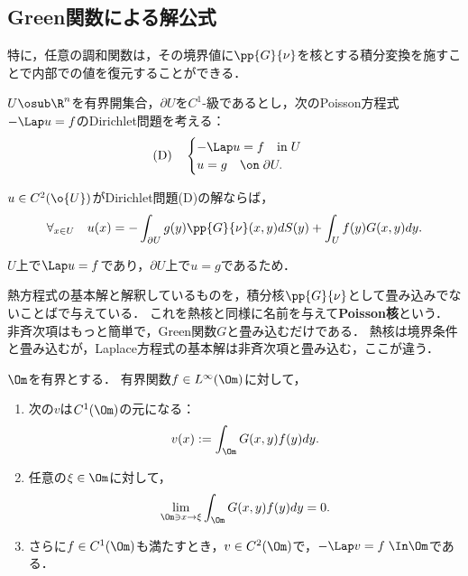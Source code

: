 \documentclass[uplatex,dvipdfmx]{jsreport}
\begin{document}
\subsection{Green関数による解公式}

\begin{tcolorbox}[colframe=ForestGreen, colback=ForestGreen!10!white,breakable,colbacktitle=ForestGreen!40!white,coltitle=black,fonttitle=\bfseries\sffamily,
title=]
    特に，任意の調和関数は，その境界値に$\pp{G}{\nu}$を核とする積分変換を施すことで内部での値を復元することができる．
\end{tcolorbox}

\begin{problem}[境界を持つ有界領域上のPoisson方程式のDirichlet問題の解法]
    $U\osub\R^n$を有界開集合，$\partial U$を$C^1$-級であるとし，次のPoisson方程式$-\Lap u=f$のDirichlet問題を考える：
    \[\text{(D)}\quad\begin{cases}
        -\Lap u=f\quad\mathrm{in}\;U\\
        u=g\quad\on\;\partial U.
    \end{cases}\]
\end{problem}

\begin{corollary}[Green関数によるDirichlet問題の解の積分表示]\label{cor-solution-via-Green-function}
    $u\in C^2(\o{U})$がDirichlet問題(D)の解ならば，
    \[\forall_{x\in U}\quad u(x)=-\int_{\partial U}g(y)\pp{G}{\nu}(x,y)dS(y)+\int_Uf(y)G(x,y)dy.\]
\end{corollary}
\begin{Proof}
    $U$上で$\Lap u=f$であり，$\partial U$上で$u=g$であるため．
\end{Proof}

\begin{remarks}
    熱方程式の基本解と解釈しているものを，積分核$\pp{G}{\nu}$として畳み込みでないことばで与えている．
    これを熱核と同様に名前を与えて\textbf{Poisson核}という．
    非斉次項はもっと簡単で，Green関数$G$と畳み込むだけである．
    熱核は境界条件と畳み込むが，Laplace方程式の基本解は非斉次項と畳み込む，ここが違う．
\end{remarks}

\begin{proposition}[解の存在の十分条件]
    $\Om$を有界とする．
    有界関数$f\in L^\infty(\Om)$に対して，
    \begin{enumerate}
        \item 次の$v$は$C^1(\Om)$の元になる：
        \[v(x):=\int_\Om G(x,y)f(y)dy.\]
        \item 任意の$\xi\in\Om$に対して，
        \[\lim_{\Om\ni x\to\xi}\int_\Om G(x,y)f(y)dy=0.\]
        \item さらに$f\in C^1(\Om)$も満たすとき，$v\in C^2(\Om)$で，$-\Lap v=f\;\In\Om$である．
    \end{enumerate}
\end{proposition}
\end{document}
